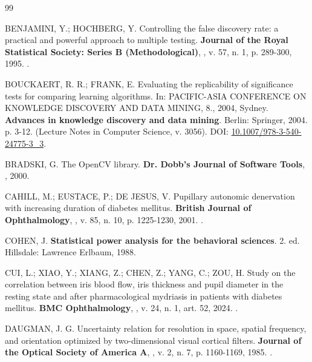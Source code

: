 \begin{thebibliography}{99}

BENJAMINI, Y.; HOCHBERG, Y. Controlling the false discovery rate: a practical
and powerful approach to multiple testing. \textbf{Journal of the Royal
Statistical Society: Series B (Methodological)}, \semlocal, v. 57, n. 1,
p. 289-300, 1995. .

BOUCKAERT, R. R.; FRANK, E. Evaluating the replicability of significance
tests for comparing learning algorithms. In: PACIFIC-ASIA CONFERENCE ON
KNOWLEDGE DISCOVERY AND DATA MINING, 8., 2004, Sydney. \textbf{Advances in
knowledge discovery and data mining}. Berlin: Springer, 2004. p. 3-12.
(Lecture Notes in Computer Science, v. 3056).
DOI: \href{https://doi.org/10.1007/978-3-540-24775-3_3}{10.1007/978-3-540-24775-3\_3}.

BRADSKI, G. The OpenCV library. \textbf{Dr. Dobb's Journal of Software
Tools}, \semlocal, 2000.

CAHILL, M.; EUSTACE, P.; DE JESUS, V. Pupillary autonomic denervation with
increasing duration of diabetes mellitus. \textbf{British Journal of
Ophthalmology}, \semlocal, v. 85, n. 10, p. 1225-1230, 2001.
.

COHEN, J. \textbf{Statistical power analysis for the behavioral sciences}.
2. ed. Hillsdale: Lawrence Erlbaum, 1988.

CUI, L.; XIAO, Y.; XIANG, Z.; CHEN, Z.; YANG, C.; ZOU, H. Study on the
correlation between iris blood flow, iris thickness and pupil diameter in the
resting state and after pharmacological mydriasis in patients with diabetes
mellitus. \textbf{BMC Ophthalmology}, \semlocal, v. 24, n. 1, art. 52, 2024.
.

DAUGMAN, J. G. Uncertainty relation for resolution in space, spatial
frequency, and orientation optimized by two-dimensional visual cortical
filters. \textbf{Journal of the Optical Society of America A}, \semlocal,
v. 2, n. 7, p. 1160-1169, 1985. .


\end{thebibliography}
